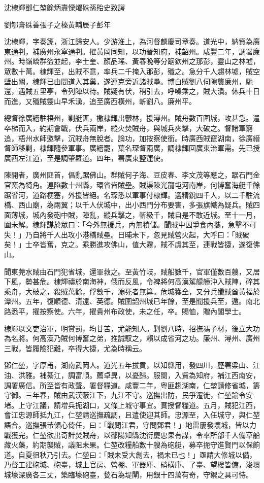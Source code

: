 
\begin{pinyinscope}
沈棣輝鄧仁堃餘炳燾慄燿硃孫貽史致諤

劉郇膏硃善張子之榛黃輔辰子彭年

沈棣輝，字奏篪，浙江歸安人。少游淮上，為河督麟慶司章奏。道光中，納貲為廣東通判，補廣州永寧通判。擢黃岡同知，以功晉知府，補韶州。咸豐二年，調署廉州。時嶺嶠群盜並起，李士奎、顏品瑤、黃春晚等分踞欽州之那彭，靈山之林墟，眾數十萬。棣輝至，出賊不意，率兵二千掩入那彭，殲之。急分千人趨林墟，賊空壁出關，棣輝已由間道入其巢，遂連克旁近諸賊壘。博白賊劉八伺隙襲廉州，馳還，遇賊五里亭，令列陣以待。賊疑有伏，稍引去，呼噪乘之，賊大潰。休兵十日而進，又殲賊靈山早禾湧，追至廣西橫州，斬劉八。廉州平。

總督徐廣縉駐梧州，剿艇匪，檄棣輝出鬱林，援潯州。賊舟數百圍城，攻甚急。遣卒梯而入，約期會戰，伏兵兩岸，縱火焚賊舟，與城兵夾擊，大破之。督諸軍窮追，梧州水師邀擊，沉賊舟無脫者。論功，加按察使銜。時廣西賊竄湖南，徐廣縉督師移剿，棣輝隨參軍事。廣縉罷，葉名琛督兩廣，調棣輝回廣東治軍需。先已授廣西左江道，至是調肇羅道。四年，署廣東鹽運使。

陳開者，廣州匪首，倡亂踞佛山。群賊何子海、豆皮春、李文茂等應之，踞石門金官窯為犄角。連陷數十州縣，環省皆賊壘。賊渠陳光龍屯河南岸，何博奮海艇千餘踞省河，道路梗塞，外援皆絕。名琛悉以軍事付棣輝。選精銳四千人，以二千駐流橋、西山廟，為兩翼；以千人伏城中，出小西門分布要害，多張旗幟為疑兵。賊四面薄城，城內發砲中賊，陣亂，縱兵擊之，斬級千，賊自是不敢近城。至十一月，圍未解。棣輝謀於眾曰：「今外無援兵，內無積儲。聞賊中因爭食內攜，急擊不可失！」乃自將千人出攻小港橋賊壘。日晡未下，忽見賊營火起，大呼曰：「賊破矣！」士卒皆奮，克之。乘勝進攻佛山，值大霧，賊不虞其至，連戰皆捷，遂復佛山。

聞東莞水賊由石門犯省城，還軍救之。至黃竹岐，賊船數千，官軍僅數百艘，又居下風，勢甚危。棣輝禱於南海神，俄而反風，令裨將何高漢駕艨艟沖入賊陣，碎其乘舟，大破之，殺賊萬餘，俘數千，溺死者無算。危城獲全，又分兵殲賊酋黃福於潭州。五年，復順德、清遠、英德。賊圍韶州城已年餘，至是聞援兵至，遁。南北路悉平，擢按察使。六年，擢貴州布政使，未之任，卒。賜恤，贈內閣學士。

棣輝以文吏治軍，明賞罰，均甘苦，尤能知人。剿劉八時，招撫馮子材，後立大功為名將。何高漢乃賊何博奮之弟，推誠馭之，賴以成省河之功。廉州、潯州、廣州三戰，皆履險犯難，卒得大捷，尤為時稱云。

鄧仁堃，字厚甫，湖南武岡人。道光五年拔貢，以知縣用，發四川，歷署梁山、江油、洪雅。補綦江，調富順。薦卓異，以憂歸。服闋，入貲為知府，補江西南安，調署廣信。所至皆有政聲。署督糧道。咸豐二年，粵匪趨湖南，仁堃請修省城，籌守御。三年春，賊由武漢蔽江下，九江不守。巡撫出防，民爭遷徙，仁堃諭令安堵。上守江議，請增兵扼湖口，又條上城守事宜。實授督糧道。五月，賊犯江西，會江忠源師抵九江，仁堃請巡撫疏調，且遣使迎其師。忠源至，入任城守，與仁堃語合。巡撫張芾傾心倚任，曰：「戰問江君，守問鄧君！」地雷屢發壞城，皆以力戰獲完。仁堃欲出奇計焚賊舟，以鄱陽知縣沈衍慶忠果有謀，令率所部千人備草船藏火藥，約期襲賊，議阻未果。仁堃改糧船數十艘為砲艇，募卒扼守進賢門以保餉道。自夏徂秋乃引去。仁堃曰：「賊未受大創去，禍未已也！」亟請大修城以備，乃督工建砲城、砲臺，城上官房、營棚、軍器庫、硝磺庫、了臺、望樓皆備，浚環城壕深廣各三丈，築臨壕砲臺，甃石為堤閘，用銀十四萬有奇，守禦之具可恃。


\end{pinyinscope}
